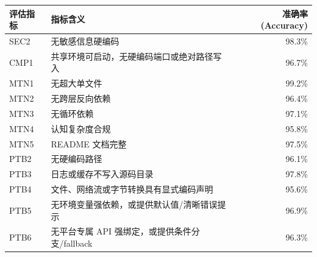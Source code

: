 \begin{tabular}{llr}
\toprule
评估指标 & 指标含义 & 准确率 (Accuracy) \\
\midrule
SEC2 & 无敏感信息硬编码 & 98.3\% \\
CMP1 & 共享环境可启动，无硬编码端口或绝对路径写入 & 96.7\% \\
MTN1 & 无超大单文件 & 99.2\% \\
MTN2 & 无跨层反向依赖 & 96.4\% \\
MTN3 & 无循环依赖 & 97.1\% \\
MTN4 & 认知复杂度合规 & 95.8\% \\
MTN5 & README 文档完整 & 97.5\% \\
PTB2 & 无硬编码路径 & 96.1\% \\
PTB3 & 日志或缓存不写入源码目录 & 97.8\% \\
PTB4 & 文件、网络流或字节转换具有显式编码声明 & 95.6\% \\
PTB5 & 无环境变量强依赖，或提供默认值/清晰错误提示 & 96.9\% \\
PTB6 & 无平台专属 API 强绑定，或提供条件分支/fallback & 96.3\% \\
\bottomrule
\end{tabular}
